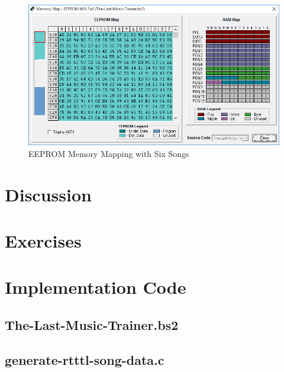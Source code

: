 \documentclass[11pt]{article}
\begin{document}
\begin{figure}[h!]
\centering
\includegraphics[width=\textwidth]{memory-map.png}
\caption{EEPROM Memory Mapping with Six Songs}
\label{memory-map}
\end{figure}

\section{Discussion}

\section{Exercises}

\clearpage

\section{Implementation Code}

\subsection{The-Last-Music-Trainer.bs2}

\begingroup
\fontsize{10pt}{12pt}

\endgroup

\clearpage
\subsection{generate-rtttl-song-data.c}
\label{generate-rtttl-songs-section}


\end{document}
